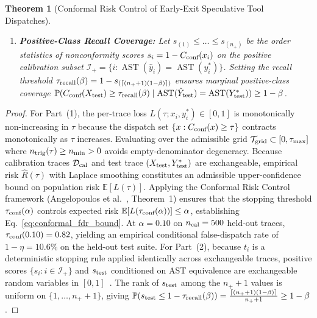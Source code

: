 \documentclass[10pt,conference]{IEEEtran}
\newtheorem{theorem}{Theorem}
\begin{document}
\begin{theorem}[Conformal Risk Control of Early-Exit Speculative Tool Dispatches]
\begin{enumerate}
    \begin{equation}
    \mathbb{E}\!\left[ L(\tau_{\textnormal{conf}}(\alpha); X_{\textnormal{test}}, Y_{\textnormal{test}}^*) \right] \le \alpha + \mathcal{O}\!\left(\frac{1}{\sqrt{n_{\textnormal{cal}}}}\right),
    \label{eq:conformal_fdr_bound}
    \end{equation}
    bounding the expected conditional speculative mismatch rate $1 - \eta \le \alpha$.
    \item \textbf{Positive-Class Recall Coverage:} Let $s_{(1)} \le \dots \le s_{(n_+)}$ be the order statistics of nonconformity scores $s_i = 1 - C_{\textnormal{conf}}(x_i)$ on the positive calibration subset $\mathcal{I}_+ = \{i : \operatorname{AST}(\hat{y}_i) = \operatorname{AST}(y_i^*)\}$. Setting the recall threshold $\tau_{\textnormal{recall}}(\beta) = 1 - s_{(\lceil (n_+ + 1)(1 - \beta) \rceil)}$ ensures marginal positive-class coverage $\mathbb{P}(C_{\textnormal{conf}}(X_{\textnormal{test}}) \ge \tau_{\textnormal{recall}}(\beta) \mid \operatorname{AST}(\hat{Y}_{\textnormal{test}}) = \operatorname{AST}(Y_{\textnormal{test}}^*)) \ge 1 - \beta$.
\end{enumerate}
\end{theorem}

\begin{proof}
For Part~(1), the per-trace loss $L(\tau; x_i, y_i^*) \in [0, 1]$ is monotonically non-increasing in $\tau$ because the dispatch set $\{x : C_{\textnormal{conf}}(x) \ge \tau\}$ contracts monotonically as $\tau$ increases. Evaluating over the admissible grid $\mathcal{T}_{\textnormal{grid}} \subset [0, \tau_{\max}]$ where $n_{\textnormal{trig}}(\tau) \ge n_{\min} > 0$ avoids empty-denominator degeneracy. Because calibration traces $\mathcal{D}_{\textnormal{cal}}$ and test trace $(X_{\textnormal{test}}, Y_{\textnormal{test}}^*)$ are exchangeable, empirical risk $\hat{R}(\tau)$ with Laplace smoothing constitutes an admissible upper-confidence bound on population risk $\mathbb{E}[L(\tau)]$. Applying the Conformal Risk Control framework (Angelopoulos et al.~\cite{angelopoulos2023conformal}, Theorem~1) ensures that the stopping threshold $\tau_{\textnormal{conf}}(\alpha)$ controls expected risk $\mathbb{E}[L(\tau_{\textnormal{conf}}(\alpha))] \le \alpha$, establishing Eq.~\eqref{eq:conformal_fdr_bound}. At $\alpha = 0.10$ on $n_{\textnormal{cal}} = 500$ held-out traces, $\tau_{\textnormal{conf}}(0.10) = 0.82$, yielding an empirical conditional false-dispatch rate of $1 - \eta = 10.6\%$ on the held-out test suite.
For Part~(2), because $t_i$ is a deterministic stopping rule applied identically across exchangeable traces, positive scores $\{s_i : i \in \mathcal{I}_+\}$ and $s_{\textnormal{test}}$ conditioned on AST equivalence are exchangeable random variables in $[0, 1]$~\cite{shafer2008tutorial}. The rank of $s_{\textnormal{test}}$ among the $n_+ + 1$ values is uniform on $\{1, \dots, n_+ + 1\}$, giving $\mathbb{P}(s_{\textnormal{test}} \le 1 - \tau_{\textnormal{recall}}(\beta)) = \frac{\lceil (n_+ + 1)(1 - \beta) \rceil}{n_+ + 1} \ge 1 - \beta$.
\end{proof}
\end{document}
